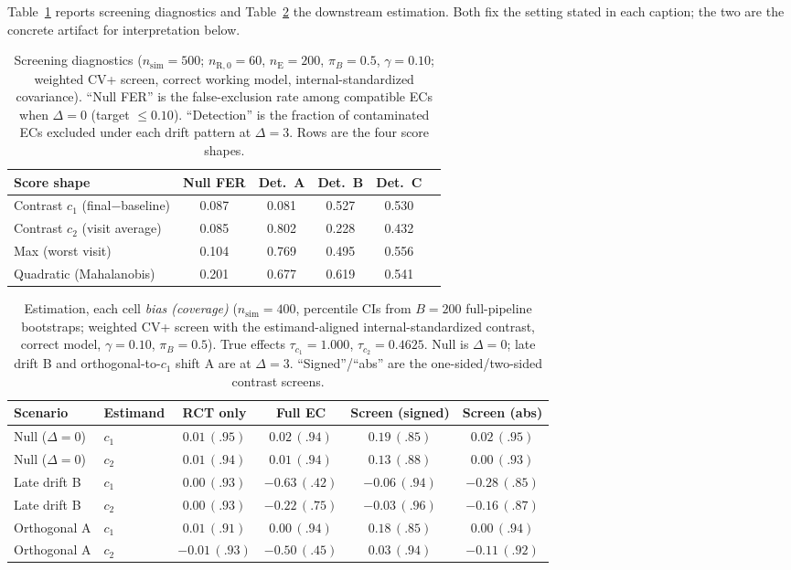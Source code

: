 \documentclass[11pt]{article}
\newcommand{\R}{\mathrm{R}}
\newcommand{\E}{\mathrm{E}}
\begin{document}
Table~\ref{tab:diagplaceholder} reports screening diagnostics and Table~\ref{tab:estplaceholder} the downstream estimation. Both fix the setting stated in each caption; the two are the concrete artifact for interpretation below.

\begin{table}[ht]
\centering
\caption{Screening diagnostics ($n_{\mathrm{sim}}=500$; $n_{\R,0}=60$, $n_{\E}=200$, $\pi_B=0.5$, $\gamma=0.10$; weighted CV+ screen, correct working model, internal-standardized covariance). ``Null FER'' is the false-exclusion rate among compatible ECs when $\Delta=0$ (target $\le 0.10$). ``Detection'' is the fraction of contaminated ECs excluded under each drift pattern at $\Delta=3$. Rows are the four score shapes.}
\begin{tabular}{lccccc}
\toprule
Score shape & Null FER & Det.\ A & Det.\ B & Det.\ C \\
\midrule
Contrast $c_1$ (final$-$baseline) & 0.087 & 0.081 & 0.527 & 0.530 \\
Contrast $c_2$ (visit average)    & 0.085 & 0.802 & 0.228 & 0.432 \\
Max (worst visit)                 & 0.104 & 0.769 & 0.495 & 0.556 \\
Quadratic (Mahalanobis)           & 0.201 & 0.677 & 0.619 & 0.541 \\
\bottomrule
\end{tabular}
\label{tab:diagplaceholder}
\end{table}

\begin{table}[ht]
\centering
\caption{Estimation, each cell \emph{bias (coverage)} ($n_{\mathrm{sim}}=400$, percentile CIs from $B=200$ full-pipeline bootstraps; weighted CV+ screen with the estimand-aligned internal-standardized contrast, correct model, $\gamma=0.10$, $\pi_B=0.5$). True effects $\tau_{c_1}=1.000$, $\tau_{c_2}=0.4625$. Null is $\Delta=0$; late drift B and orthogonal-to-$c_1$ shift A are at $\Delta=3$. ``Signed''/``abs'' are the one-sided/two-sided contrast screens.}
\begin{tabular}{llcccc}
\toprule
Scenario & Estimand & RCT only & Full EC & Screen (signed) & Screen (abs) \\
\midrule
Null ($\Delta{=}0$) & $c_1$ & $0.01\,(.95)$ & $0.02\,(.94)$ & $0.19\,(.85)$ & $0.02\,(.95)$ \\
Null ($\Delta{=}0$) & $c_2$ & $0.01\,(.94)$ & $0.01\,(.94)$ & $0.13\,(.88)$ & $0.00\,(.93)$ \\
Late drift B & $c_1$ & $0.00\,(.93)$ & $-0.63\,(.42)$ & $-0.06\,(.94)$ & $-0.28\,(.85)$ \\
Late drift B & $c_2$ & $0.00\,(.93)$ & $-0.22\,(.75)$ & $-0.03\,(.96)$ & $-0.16\,(.87)$ \\
Orthogonal A & $c_1$ & $0.01\,(.91)$ & $0.00\,(.94)$ & $0.18\,(.85)$ & $0.00\,(.94)$ \\
Orthogonal A & $c_2$ & $-0.01\,(.93)$ & $-0.50\,(.45)$ & $0.03\,(.94)$ & $-0.11\,(.92)$ \\
\bottomrule
\end{tabular}
\label{tab:estplaceholder}
\end{table}
\end{document}
